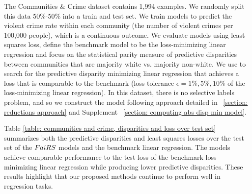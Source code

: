 \documentclass{article}
\begin{document}
The Communities \& Crime dataset \cite{Dua:2019} contains 1,994 examples. We randomly split this data 50\%-50\% into a train and test set. We train models to predict the violent crime rate within each community (the number of violent crimes per 100,000 people), which is a continuous outcome. We evaluate models using least squares loss, define the benchmark model to be the loss-minimizing linear regression and focus on the statistical parity measure of predictive disparities between communities that are majority white vs. majority non-white. We use \fairs to search for the predictive disparity minimizing linear regression that achieves a loss that is comparable to the benchmark (loss tolerance $\epsilon = 1\%, 5\%, 10\%$ of the loss-minimizing linear regression). In this dataset, there is no selective labels problem, and so we construct the \fairs model following approach detailed in \textsection~\ref{section: reductions approach} and Supplement \textsection~\ref{section: computing abs disp min model}.
 
Table \ref{table: communities and crime, disparities and loss over test set} summarizes both the predictive disparities and least squares losses over the test set of the $FaiRS$ models and the benchmark linear regression. The \fairs models achieve comparable performance to the test loss of the benchmark loss-minimizing linear regression while producing lower predictive disparities. These results highlight that our proposed methods continue to perform well in regression tasks.
\end{document}
